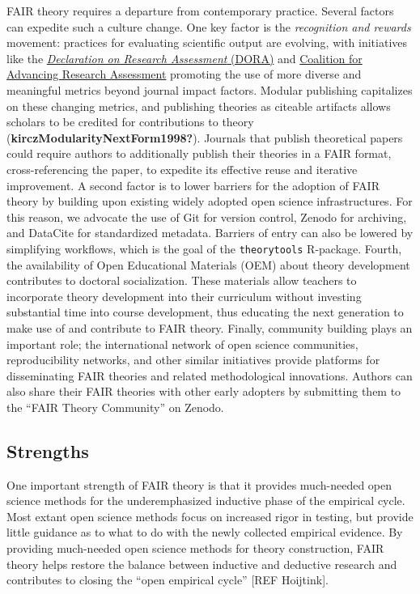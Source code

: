 \documentclass[
  man,floatsintext]{apa6}
\begin{document}
FAIR theory requires a departure from contemporary practice.
Several factors can expedite such a culture change.
One key factor is the \emph{recognition and rewards} movement:
practices for evaluating scientific output are evolving, with initiatives like the \href{https://sfdora.org/read/}{\emph{Declaration on Research Assessment} (DORA)} and \href{https://coara.eu/}{Coalition for Advancing Research Assessment}
promoting the use of more diverse and meaningful metrics beyond journal impact factors.
Modular publishing capitalizes on these changing metrics,
and publishing theories as citeable artifacts allows scholars to be credited for contributions to theory (\textbf{kirczModularityNextForm1998?}).
Journals that publish theoretical papers could require authors to additionally publish their theories in a FAIR format, cross-referencing the paper,
to expedite its effective reuse and iterative improvement.
A second factor is to lower barriers for the adoption of FAIR theory by building upon existing widely adopted open science infrastructures.
For this reason, we advocate the use of Git for version control, Zenodo for archiving, and DataCite for standardized metadata.
Barriers of entry can also be lowered by simplifying workflows, which is the goal of the \texttt{theorytools} R-package.
Fourth, the availability of Open Educational Materials (OEM) about theory development contributes to doctoral socialization.
These materials allow teachers to incorporate theory development into their curriculum without investing substantial time into course development,
thus educating the next generation to make use of and contribute to FAIR theory.
Finally, community building plays an important role;
the international network of open science communities, reproducibility networks, and other similar initiatives provide platforms for disseminating FAIR theories and related methodological innovations.
Authors can also share their FAIR theories with other early adopters by submitting them to the ``FAIR Theory Community'' on Zenodo.

\subsection{Strengths}\label{strengths}

One important strength of FAIR theory is that it provides much-needed open science methods for the underemphasized inductive phase of the empirical cycle.
Most extant open science methods focus on increased rigor in testing, but provide little guidance as to what to do with the newly collected empirical evidence.
By providing much-needed open science methods for theory construction,
FAIR theory helps restore the balance between inductive and deductive research and contributes to closing the ``open empirical cycle'' {[}REF Hoijtink{]}.
\end{document}
